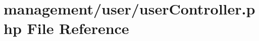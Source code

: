 \hypertarget{user_controller_8php}{}\section{management/user/user\+Controller.php File Reference}
\label{user_controller_8php}
